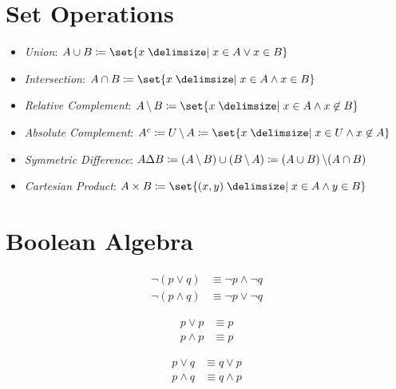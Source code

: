 \section{Set Operations}
\begin{itemize}
    \item \textit{Union}: $A \cup B \coloneqq \set{x \given x \in A \lor x \in B}$
    \item \textit{Intersection}: $A \cap B \coloneqq \set{x \given x \in A \land x \in B}$
    \item \textit{Relative Complement}: $A \Diff B \coloneqq \set{x \given x \in A \land x \not\in B}$
    \item \textit{Absolute Complement}: $\AbsComplement{A} \coloneqq U \Diff A \coloneqq \set{x \given x \in U \land x \not\in A}$
    \item \textit{Symmetric Difference}: $A \Delta B \coloneqq (A \operatorname{\backslash} B) \cup (B \operatorname{\backslash} A) \coloneqq (A \cup B)\operatorname{\backslash}(A \cap B)$
    \item \textit{Cartesian Product}: $A \times B \coloneqq \set{(x, y) \given x \in A \land y \in B}$
\end{itemize}

\section{Boolean Algebra}
\begin{definition}
\begin{align}
    \neg (p \lor q ) &\equiv \neg p \land \neg q \\
    \neg (p \land q) &\equiv \neg p \lor \neg q 
\end{align}
\end{definition}

\begin{definition}
\begin{align}
    p \lor p &\equiv p \\
    p \land p &\equiv p
\end{align}

\end{definition}

\begin{definition}
\begin{align}
    p \lor q &\equiv q \lor p \\
    p \land q &\equiv q \land p
\end{align}
\end{definition}

